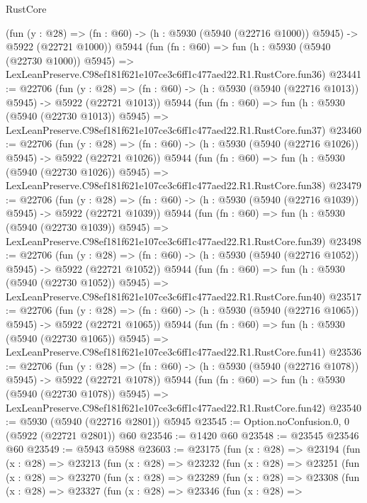 \begin{lexlean}{RustCore}
\begin{coremodule}
    (fun (y : @28) =>
    (fn : @60) -> (h : @5930 (@5940 (@22716 @1000)) @5945) -> @5922 (@22721 @1000))
    @5944
    (fun (fn : @60) =>
    fun (h : @5930 (@5940 (@22730 @1000)) @5945) =>
    LexLeanPreserve.C98ef181f621e107ce3c6ff1c477aed22.R1.RustCore.fun36)
@23441 := @22706
    (fun (y : @28) =>
    (fn : @60) -> (h : @5930 (@5940 (@22716 @1013)) @5945) -> @5922 (@22721 @1013))
    @5944
    (fun (fn : @60) =>
    fun (h : @5930 (@5940 (@22730 @1013)) @5945) =>
    LexLeanPreserve.C98ef181f621e107ce3c6ff1c477aed22.R1.RustCore.fun37)
@23460 := @22706
    (fun (y : @28) =>
    (fn : @60) -> (h : @5930 (@5940 (@22716 @1026)) @5945) -> @5922 (@22721 @1026))
    @5944
    (fun (fn : @60) =>
    fun (h : @5930 (@5940 (@22730 @1026)) @5945) =>
    LexLeanPreserve.C98ef181f621e107ce3c6ff1c477aed22.R1.RustCore.fun38)
@23479 := @22706
    (fun (y : @28) =>
    (fn : @60) -> (h : @5930 (@5940 (@22716 @1039)) @5945) -> @5922 (@22721 @1039))
    @5944
    (fun (fn : @60) =>
    fun (h : @5930 (@5940 (@22730 @1039)) @5945) =>
    LexLeanPreserve.C98ef181f621e107ce3c6ff1c477aed22.R1.RustCore.fun39)
@23498 := @22706
    (fun (y : @28) =>
    (fn : @60) -> (h : @5930 (@5940 (@22716 @1052)) @5945) -> @5922 (@22721 @1052))
    @5944
    (fun (fn : @60) =>
    fun (h : @5930 (@5940 (@22730 @1052)) @5945) =>
    LexLeanPreserve.C98ef181f621e107ce3c6ff1c477aed22.R1.RustCore.fun40)
@23517 := @22706
    (fun (y : @28) =>
    (fn : @60) -> (h : @5930 (@5940 (@22716 @1065)) @5945) -> @5922 (@22721 @1065))
    @5944
    (fun (fn : @60) =>
    fun (h : @5930 (@5940 (@22730 @1065)) @5945) =>
    LexLeanPreserve.C98ef181f621e107ce3c6ff1c477aed22.R1.RustCore.fun41)
@23536 := @22706
    (fun (y : @28) =>
    (fn : @60) -> (h : @5930 (@5940 (@22716 @1078)) @5945) -> @5922 (@22721 @1078))
    @5944
    (fun (fn : @60) =>
    fun (h : @5930 (@5940 (@22730 @1078)) @5945) =>
    LexLeanPreserve.C98ef181f621e107ce3c6ff1c477aed22.R1.RustCore.fun42)
@23540 := @5930 (@5940 (@22716 @2801)) @5945
@23545 := Option.noConfusion.{0, 0} (@5922 (@22721 @2801)) @60
@23546 := @1420 @60
@23548 := @23545 @23546 @60
@23549 := @5943 @5988
@23603 := @23175
    (fun (x : @28) =>
    @23194
      (fun (x : @28) =>
      @23213
        (fun (x : @28) =>
        @23232
          (fun (x : @28) =>
          @23251
            (fun (x : @28) =>
            @23270
              (fun (x : @28) =>
              @23289
                (fun (x : @28) =>
                @23308
                  (fun (x : @28) =>
                  @23327
                    (fun (x : @28) =>
                    @23346
                      (fun (x : @28) =>

\end{coremodule}
\end{lexlean}
